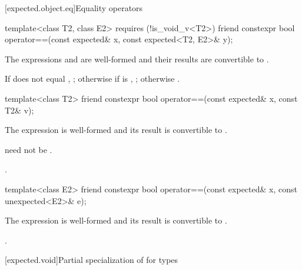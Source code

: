 [expected.object.eq]{Equality operators}

%
\begin{itemdecl}
template<class T2, class E2> requires (!is_void_v<T2>)
  friend constexpr bool operator==(const expected& x, const expected<T2, E2>& y);
\end{itemdecl}

\begin{itemdescr}
\pnum
\mandates
The expressions  and 
are well-formed and their results are convertible to .

\pnum
\returns
If  does not equal , ;
otherwise if  is , ;
otherwise .
\end{itemdescr}

%
\begin{itemdecl}
template<class T2> friend constexpr bool operator==(const expected& x, const T2& v);
\end{itemdecl}

\begin{itemdescr}
\pnum
\mandates
The expression  is well-formed and
its result is convertible to .
\begin{note}
 need not be .
\end{note}

\pnum
\returns
{}.
\end{itemdescr}

%
\begin{itemdecl}
template<class E2> friend constexpr bool operator==(const expected& x, const unexpected<E2>& e);
\end{itemdecl}

\begin{itemdescr}
\pnum
\mandates
The expression  is well-formed and
its result is convertible to .

\pnum
\returns
{}.
\end{itemdescr}

[expected.void]{Partial specialization of  for  types}

